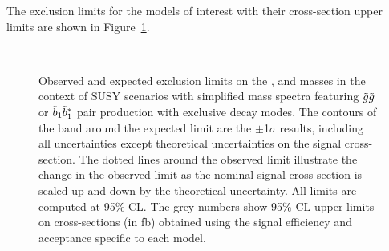 %
%
%

The exclusion limits for the models of interest with their cross-section upper limits are shown in Figure~\ref{fig:Results_Limits_GN}.

\begin{figure}[htb!]
\centering
{}
\\
\caption{Observed and expected exclusion limits on the \gluino, \sbottomone and \ninoone masses 
in the context of SUSY scenarios with simplified mass spectra 
featuring $\tilde{g}\tilde{g}$ or $\tilde{b}_1 \tilde{b}_{1}^{*}$ pair production with exclusive decay modes. 
The contours of the band around the expected limit are the $\pm$1$\sigma$ results, 
  including all uncertainties except theoretical uncertainties on the signal cross-section. The dotted lines around the observed
    limit illustrate the change in the observed limit as the nominal signal cross-section is scaled up and down
    by the theoretical uncertainty. All limits are computed at 95\% CL.
The grey numbers show 95\% CL upper limits on cross-sections (in fb) obtained using the signal efficiency and acceptance specific to each model.}
\label{fig:Results_Limits_GN} 
\end{figure}
